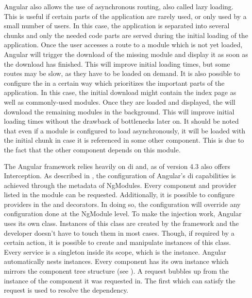 Angular also allows the use of asynchronous routing, also called lazy loading. This is useful if certain parts of the application are rarely used, or only used by a small number of users. In this case, the application is separated into several chunks and only the needed code parts are served during the initial loading of the application. Once the user accesses a route to a module which is not yet loaded, Angular will trigger the download of the missing module and display it as soon as the download has finished. This will improve initial loading times, but some routes may be slow, as they have to be loaded on demand. It is also possible to configure the  in a certain way which prioritizes the important parts of the application. In this case, the initial download might contain the index page as well as commonly-used modules. Once they are loaded and displayed, the  will download the remaining modules in the background. This will improve initial loading times without the drawback of bottlenecks later on. It should be noted that even if a module is configured to load asynchronously, it will be loaded with the initial chunk in case it is referenced in some other component. This is due to the fact that the other component depends on this module.


The Angular framework relies heavily on \gls{di} and, as of version 4.3 \cite{interceptorAngularVersion} also offers Interception. As described in , the configuration of Angular's \gls{di} capabilities is achieved through the metadata of NgModules. Every component and provider listed in the module can be requested. Additionally, it is possible to configure providers in the  and  decorators. In doing so, the configuration will override any configuration done at the NgModule level. To make the injection work, Angular uses its own  class. Instances of this class are created by the framework and the developer doesn't have to touch them in most cases. Though, if required by a certain action, it is possible to create and manipulate instances of this class. Every service is a singleton inside its scope, which is the  instance. Angular automatically nests  instances. Every component has its own  instance which mirrors the component tree structure (see ). A request bubbles up from the  instance of the component it was requested in. The first  which can satisfy the request is used to resolve the dependency.

